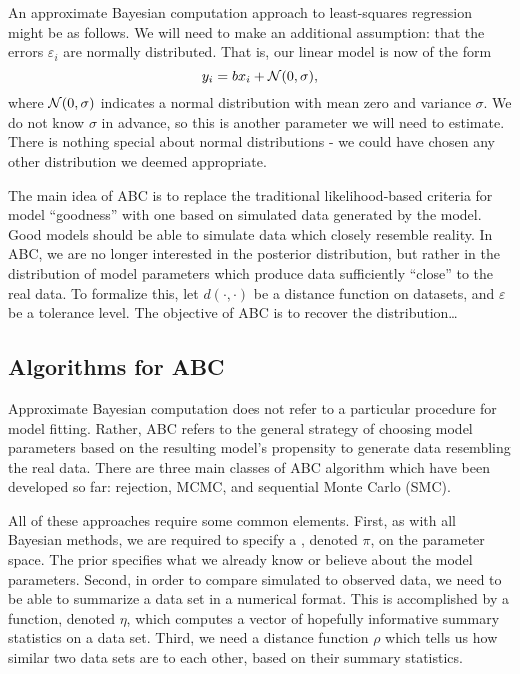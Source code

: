 An approximate Bayesian computation approach to least-squares regression might
be as follows. We will need to make an additional assumption: that the errors
$\varepsilon_i$ are normally distributed. That is, our linear model is now of
the form
\[
  y_i = bx_i + \mathcal{N}(0, \sigma),
\]
where $\mathcal{N}(0, \sigma)$ indicates a normal distribution with mean zero and
variance $\sigma$. We do not know $\sigma$ in advance, so this is another
parameter we will need to estimate. There is nothing special about normal
distributions - we could have chosen any other distribution we deemed
appropriate. 

The main idea of \gls{ABC} is to replace the traditional likelihood-based
criteria for model ``goodness'' with one based on simulated data generated by
the model. Good models should be able to simulate data which closely resemble
reality. In \gls{ABC}, we are no longer interested in the posterior
distribution, but rather in the distribution of model parameters which produce
data sufficiently ``close'' to the real data. To formalize this, let $d(\cdot,
\cdot)$ be a distance function on datasets, and $\varepsilon$ be a tolerance
level. The objective of \gls{ABC} is to recover the distribution\ldots

\subsection{Algorithms for ABC}
\label{subsubsec:abcalg}

Approximate Bayesian computation does not refer to a particular procedure for
model fitting. Rather, ABC refers to the general strategy of choosing model
parameters based on the resulting model's propensity to generate data
resembling the real data. There are three main classes of ABC algorithm which
have been developed so far: rejection, \gls{MCMC}, and sequential Monte Carlo
(SMC). 

All of these approaches require some common elements. First, as with all
Bayesian methods, we are required to specify a ,
denoted $\pi$, on the parameter space. The prior specifies what we already know
or believe about the model parameters. Second, in order to compare simulated to
observed data, we need to be able to summarize a data set in a numerical
format. This is accomplished by a function, denoted $\eta$, which computes a
vector of hopefully informative summary statistics on a data set. Third, we
need a distance function $\rho$ which tells us how similar two data sets are to
each other, based on their summary statistics.

